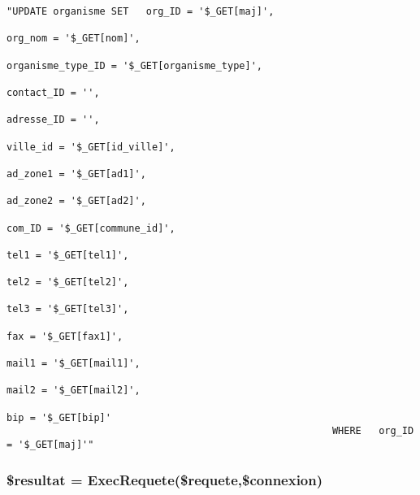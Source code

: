 \footnotesize\begin{verbatim}"UPDATE organisme SET   org_ID = '$_GET[maj]',
                                                                        org_nom = '$_GET[nom]',
                                                                        organisme_type_ID = '$_GET[organisme_type]',
                                                                        contact_ID = '',
                                                                        adresse_ID = '',
                                                                        ville_id = '$_GET[id_ville]',
                                                                        ad_zone1 = '$_GET[ad1]',
                                                                        ad_zone2 = '$_GET[ad2]',
                                                                        com_ID = '$_GET[commune_id]',
                                                                        tel1 = '$_GET[tel1]',
                                                                        tel2 = '$_GET[tel2]',
                                                                        tel3 = '$_GET[tel3]',
                                                                        fax = '$_GET[fax1]',
                                                                        mail1 = '$_GET[mail1]',
                                                                        mail2 = '$_GET[mail2]',
                                                                        bip = '$_GET[bip]'
                                                        WHERE   org_ID = '$_GET[maj]'"
\end{verbatim}\normalsize 
\hypertarget{organisme__enregistre_8php_a2}{
\subsubsection[\$resultat]{\setlength{\rightskip}{0pt plus 5cm}\$resultat = Exec\-Requete(\$requete,\$connexion)}}
\label{organisme__enregistre_8php_a2}


